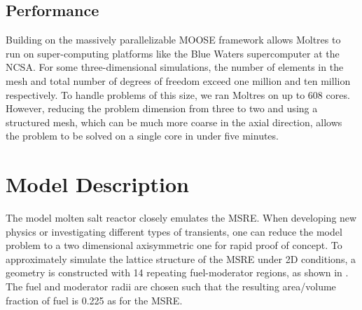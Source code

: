 \documentclass{article}
\let\Oldsection\section
\renewcommand{\section}{\FloatBarrier\Oldsection}
\let\Oldsubsection\subsection
\renewcommand{\subsection}{\FloatBarrier\Oldsubsection}
\begin{document}
\subsection{Performance}

Building on the massively parallelizable \gls{MOOSE} framework allows Moltres
to run on super-computing platforms like the Blue Waters supercomputer at the 
\gls{NCSA}. For some
three-dimensional simulations, the number of
elements in the mesh and total number of degrees of freedom exceed one million
and ten million respectively. To handle problems of this size, we ran Moltres
on up to 608 cores. However, reducing the problem dimension from three to
two and using a structured mesh, which can be much more coarse in the axial
direction, allows the problem to be solved on a single core in under
five minutes.

\section{Model Description}

The model molten salt reactor closely emulates the \gls{MSRE}. When developing new physics or investigating
different types of transients, one can reduce the model problem to a two
dimensional axisymmetric one for rapid proof of concept. To approximately simulate the lattice
structure of the \gls{MSRE} under 2D conditions, a geometry is constructed with 14 repeating
fuel-moderator regions, as shown in . The fuel and moderator
radii are chosen such that the resulting area/volume fraction of fuel is 0.225 as
for the \gls{MSRE}.
\end{document}
